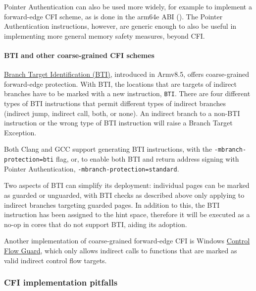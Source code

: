 \documentclass[
  a4paper,
]{report}
\begin{document}
Pointer Authentication can also be used more widely, for example to
implement a forward-edge CFI scheme, as is done in the arm64e ABI
(). The Pointer
Authentication instructions, however, are generic enough to also be
useful in implementing more general memory safety measures, beyond CFI.

\paragraph{BTI and other coarse-grained CFI schemes}\label{sec:bti}

\href{https://developer.arm.com/documentation/102433/0100/Jump-oriented-programming?lang=en}{\label{__index_entry_58}{Branch
Target Identification (BTI)}},
introduced in Armv8.5, offers coarse-grained forward-edge protection.
With BTI, the locations that are targets of indirect branches have to be
marked with a new instruction, \texttt{BTI}. There are four different
types of BTI instructions that permit different types of indirect
branches (indirect jump, indirect call, both, or none). An indirect
branch to a non-BTI instruction or the wrong type of BTI instruction
will raise a Branch Target Exception.

Both Clang and GCC support generating BTI instructions, with the
\texttt{-mbranch-protection=bti} flag, or, to enable both BTI and return
address signing with Pointer Authentication,
\texttt{-mbranch-protection=standard}.

Two aspects of BTI can simplify its deployment: individual pages can be
marked as guarded or unguarded, with BTI checks as described above only
applying to indirect branches targeting guarded pages. In addition to
this, the BTI instruction has been assigned to the hint space, therefore
it will be executed as a no-op in cores that do not support BTI, aiding
its adoption.

Another implementation of coarse-grained forward-edge CFI is Windows
\href{https://docs.microsoft.com/en-us/windows/win32/secbp/control-flow-guard}{Control
Flow Guard}, which only allows indirect calls to functions that are
marked as valid indirect control flow targets.

\subsubsection{CFI implementation
pitfalls}\label{cfi-implementation-pitfalls}
\end{document}
